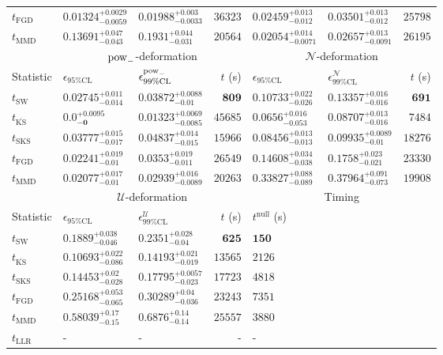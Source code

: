 \begin{tabular}{l|llr|llr}
	$t_{\mathrm{FGD}}$ & ${\mathbf{0.01324_{-0.0059}^{+0.0029}}}$ & ${\mathbf{0.01988_{-0.0033}^{+0.003}}}$ & $36323$ & $0.02459_{-0.012}^{+0.013}$ & $0.03501_{-0.012}^{+0.013}$ & $25798$ \\
	$t_{\mathrm{MMD}}$ & $0.13691_{-0.043}^{+0.047}$ & $0.1931_{-0.031}^{+0.044}$ & $20564$ & $0.02054_{-0.0071}^{+0.014}$ & $0.02657_{-0.0091}^{+0.013}$ & $26195$ \\
	\toprule
	\multicolumn{1}{c}{} & \multicolumn{3}{c}{$\rm{pow}_{-}$-deformation} & \multicolumn{3}{c}{$\mathcal{N}$-deformation} \\
	Statistic & $\epsilon_{95\%\mathrm{CL}}$ & $\epsilon^  {\rm{pow}_{-}}_{99\%\mathrm{CL}}$ & $t$ (s) & $\epsilon_{95\%\mathrm{CL}}$ & $\epsilon^    {\mathcal{N}}_{99\%\mathrm{CL}}$ & $t$ (s) \\
	\midrule
	$t_{\mathrm{SW}}$ & $0.02745_{-0.014}^{+0.011}$ & $0.03872_{-0.01}^{+0.0088}$ & ${\mathbf{809}}$ & $0.10733_{-0.026}^{+0.022}$ & $0.13357_{-0.016}^{+0.016}$ & ${\mathbf{691}}$ \\
	$t_{\overline{\mathrm{KS}}}$ & ${\mathbf{0.0_{-0}^{+0.0095}}}$ & ${\mathbf{0.01323_{-0.0085}^{+0.0069}}}$ & $45685$ & ${\mathbf{0.0656_{-0.053}^{+0.016}}}$ & ${\mathbf{0.08707_{-0.016}^{+0.013}}}$ & $7484$ \\
	$t_{\mathrm{SKS}}$ & $0.03777_{-0.017}^{+0.015}$ & $0.04837_{-0.015}^{+0.014}$ & $15966$ & $0.08456_{-0.013}^{+0.013}$ & $0.09935_{-0.01}^{+0.0089}$ & $18276$ \\
	$t_{\mathrm{FGD}}$ & $0.02241_{-0.01}^{+0.019}$ & $0.0353_{-0.011}^{+0.019}$ & $26549$ & $0.14608_{-0.038}^{+0.034}$ & $0.1758_{-0.021}^{+0.023}$ & $23330$ \\
	$t_{\mathrm{MMD}}$ & $0.02077_{-0.01}^{+0.017}$ & $0.02939_{-0.0089}^{+0.016}$ & $20263$ & $0.33827_{-0.089}^{+0.088}$ & $0.37964_{-0.073}^{+0.091}$ & $19908$ \\
	\toprule
	\multicolumn{1}{c}{} & \multicolumn{3}{c}{$\mathcal{U}$-deformation} & \multicolumn{3}{c}{Timing} \\
	Statistic & $\epsilon_{95\%\mathrm{CL}}$ & $\epsilon^    {\mathcal{U}}_{99\%\mathrm{CL}}$ & $t$ (s) & $t^{\mathrm{null}}$ (s) \\
	\midrule
	$t_{\mathrm{SW}}$ & $0.1889_{-0.046}^{+0.038}$ & $0.2351_{-0.04}^{+0.028}$ & ${\mathbf{625}}$ & ${\mathbf{150}}$ \\
	$t_{\overline{\mathrm{KS}}}$ & ${\mathbf{0.10693_{-0.086}^{+0.022}}}$ & ${\mathbf{0.14193_{-0.019}^{+0.021}}}$ & $13565$ & $2126$ \\
	$t_{\mathrm{SKS}}$ & $0.14453_{-0.028}^{+0.02}$ & $0.17795_{-0.023}^{+0.0057}$ & $17723$ & $4818$ \\
	$t_{\mathrm{FGD}}$ & $0.25168_{-0.065}^{+0.053}$ & $0.30289_{-0.036}^{+0.04}$ & $23243$ & $7351$ \\
	$t_{\mathrm{MMD}}$ & $0.58039_{-0.15}^{+0.17}$ & $0.6876_{-0.14}^{+0.14}$ & $25557$ & $3880$ \\
	$t_{\mathrm{LLR}}$ & - & - & - & - \\
	\bottomrule
\end{tabular}
